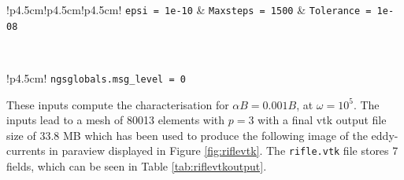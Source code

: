 \begin{table}[H]
\begin{center}
\begin{tabular}{!\vrule p{4.5cm}!\vrule p{4.5cm}!\vrule p{4.5cm}!\vrule}
\texttt{epsi = 1e-10} & \texttt{Maxsteps = 1500} & \texttt{Tolerance = 1e-08}\\\hline
\end{tabular}\\
\begin{tabular}{!\vrule p{4.5cm}!\vrule}
\texttt{ngsglobals.msg\_level = 0}\\\hline
\end{tabular}
\caption{A table summarising the inputs for the simulation of a rifle shell casing for a single frequency with a vtk output.}\label{tab:riflevtk}
\end{center}
\end{table}
\noindent
These inputs compute the characterisation for $\alpha B = 0.001B$, at $\omega = 10^5$. The inputs lead to a mesh of 80013 elements with $p=3$ with a final vtk output file size of 33.8 MB which has been used to produce the following image of the eddy-currents in paraview displayed in Figure \ref{fig:riflevtk}. The \texttt{rifle.vtk} file stores 7 fields, which can be seen in Table \ref{tab:riflevtkoutput}.
